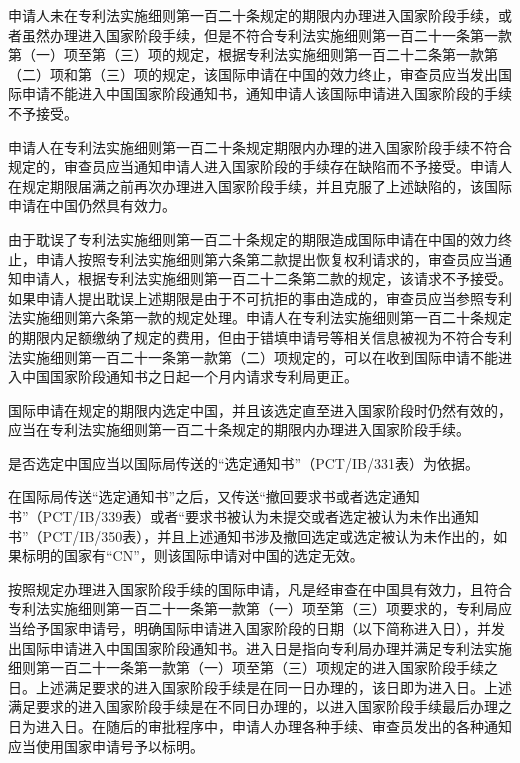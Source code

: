 {\setlength{\parindent}{0.0bp}申请人未在专利法实施细则第一百二十条规定的期限内办理进入国家阶段手续，或者虽然办理进入国家阶段手续，但是不符合专利法实施细则第一百二十一条第一款第（一）项至第（三）项的规定，根据专利法实施细则第一百二十二条第一款第（二）项和第（三）项的规定，该国际申请在中国的效力终止，审查员应当发出国际申请不能进入中国国家阶段通知书，通知申请人该国际申请进入国家阶段的手续不予接受。\par}

申请人在专利法实施细则第一百二十条规定期限内办理的进入国家阶段手续不符合规定的，审查员应当通知申请人进入国家阶段的手续存在缺陷而不予接受。申请人在规定期限届满之前再次办理进入国家阶段手续，并且克服了上述缺陷的，该国际申请在中国仍然具有效力。

由于耽误了专利法实施细则第一百二十条规定的期限造成国际申请在中国的效力终止，申请人按照专利法实施细则第六条第二款提出恢复权利请求的，审查员应当通知申请人，根据专利法实施细则第一百二十二条第二款的规定，该请求不予接受。如果申请人提出耽误上述期限是由于不可抗拒的事由造成的，审查员应当参照专利法实施细则第六条第一款的规定处理。申请人在专利法实施细则第一百二十条规定的期限内足额缴纳了规定的费用，但由于错填申请号等相关信息被视为不符合专利法实施细则第一百二十一条第一款第（二）项规定的，可以在收到国际申请不能进入中国国家阶段通知书之日起一个月内请求专利局更正。

国际申请在规定的期限内选定中国，并且该选定直至进入国家阶段时仍然有效的，应当在专利法实施细则第一百二十条规定的期限内办理进入国家阶段手续。

是否选定中国应当以国际局传送的“选定通知书”（PCT/IB/331表）为依据。

在国际局传送“选定通知书”之后，又传送“撤回要求书或者选定通知书”（PCT/IB/339表）或者“要求书被认为未提交或者选定被认为未作出通知书”（PCT/IB/350表），并且上述通知书涉及撤回选定或选定被认为未作出的，如果标明的国家有“CN”，则该国际申请对中国的选定无效。

按照规定办理进入国家阶段手续的国际申请，凡是经审查在中国具有效力，且符合专利法实施细则第一百二十一条第一款第（一）项至第（三）项要求的，专利局应当给予国家申请号，明确国际申请进入国家阶段的日期（以下简称进入日），并发出国际申请进入中国国家阶段通知书。进入日是指向专利局办理并满足专利法实施细则第一百二十一条第一款第（一）项至第（三）项规定的进入国家阶段手续之日。上述满足要求的进入国家阶段手续是在同一日办理的，该日即为进入日。上述满足要求的进入国家阶段手续是在不同日办理的，以进入国家阶段手续最后办理之日为进入日。在随后的审批程序中，申请人办理各种手续、审查员发出的各种通知应当使用国家申请号予以标明。

